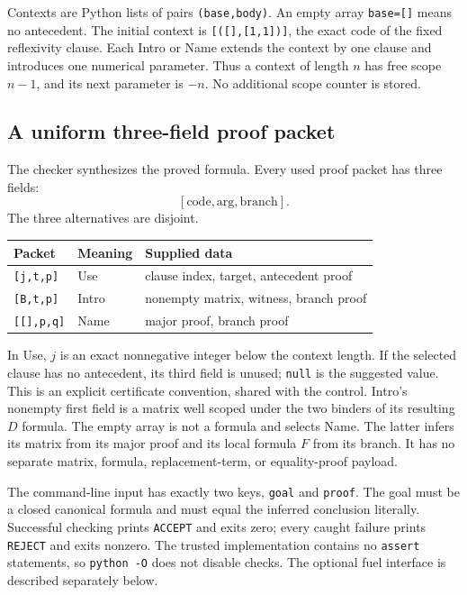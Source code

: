 \documentclass[11pt,a4paper]{article}
\theoremstyle{definition}\newtheorem{definition}[theorem]{Definition}
\theoremstyle{remark}\newtheorem{remark}[theorem]{Remark}
\begin{document}
Contexts are Python lists of pairs \texttt{(base,body)}. An empty
array \texttt{base=[]} means no antecedent. The initial context is
\texttt{[([],[1,1])]}, the exact code of the fixed reflexivity clause.
Each Intro or Name extends the context by one clause and introduces one
numerical parameter. Thus a context of length $n$ has free scope $n-1$,
and its next parameter is $-n$. No additional scope counter is stored.

\subsection{A uniform three-field proof packet}

The checker synthesizes the proved formula. Every used proof packet has
three fields:
\[
                   [\mathrm{code},\mathrm{arg},\mathrm{branch}].
\]
The three alternatives are disjoint.

\begin{center}
\begin{tabular}{@{}lll@{}}
\toprule
Packet & Meaning & Supplied data \\
\midrule
\texttt{[j,t,p]} & Use & clause index, target, antecedent proof \\
\texttt{[B,t,p]} & Intro & nonempty matrix, witness, branch proof \\
\texttt{[[],p,q]} & Name & major proof, branch proof \\
\bottomrule
\end{tabular}
\end{center}

In Use, $j$ is an exact nonnegative integer below the context length.
If the selected clause has no antecedent, its third field is unused;
\texttt{null} is the suggested value. This is an explicit certificate
convention, shared with the control. Intro's nonempty first field is a
matrix well scoped under the two binders of its resulting $D$ formula.
The empty array is not a formula and selects Name. The latter infers its
matrix from its major proof and its local formula $F$ from its branch.
It has no separate matrix, formula, replacement-term, or equality-proof
payload.

The command-line input has exactly two keys, \texttt{goal} and
\texttt{proof}. The goal must be a closed canonical formula and must
equal the inferred conclusion literally. Successful checking prints
\texttt{ACCEPT} and exits zero; every caught failure prints
\texttt{REJECT} and exits nonzero. The trusted implementation contains
no \texttt{assert} statements, so \texttt{python -O} does not disable
checks. The optional fuel interface is described separately below.
\end{document}
